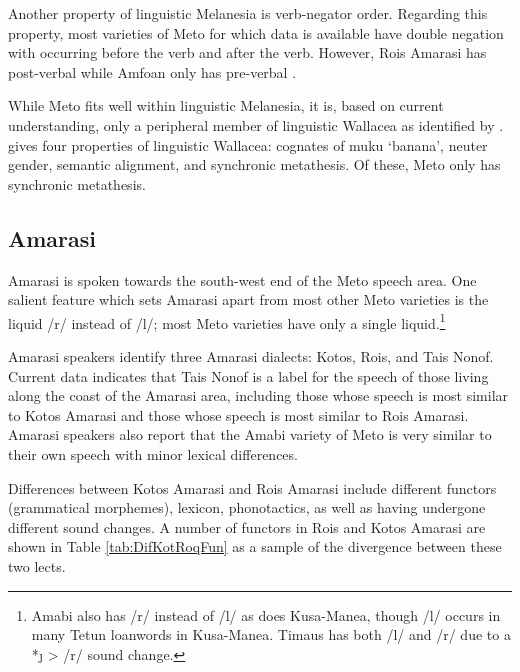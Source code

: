 Another property of linguistic Melanesia is verb-negator order.
Regarding this property, most varieties of Meto
for which data is available have double negation
with  occurring before the verb and  after the verb.
However, Ro{\Q}is Amarasi has post-verbal 
while Amfo{\Q}an only has pre-verbal .

While Meto fits well within linguistic Melanesia,
it is, based on current understanding,
only a peripheral member of linguistic Wallacea as identified by \cite{sc15}.
\citeauthor{sc15} gives four properties of linguistic
Wallacea: cognates of \su{\#}muku `banana', neuter gender,
semantic alignment, and synchronic metathesis.
Of these, Meto only has synchronic metathesis.

\subsection{Amarasi}\label{sec:Amarasi}
Amarasi is spoken towards the south-west end of the Meto speech area.
One salient feature which sets Amarasi apart from most other Meto
varieties is the liquid /r/ instead of /l/;
most Meto varieties have only a single liquid.\footnote{
		Amabi also has /r/ instead of /l/ as does
		Kusa-Manea, though /l/ occurs in many Tetun loanwords in Kusa-Manea.
		Timaus has both /l/ and /r/ due to a *{\j} > /r/ sound change.}

Amarasi speakers identify three Amarasi dialects: Kotos, Ro{\Q}is, and Tais Nonof.
Current data indicates that Tais Nonof is a label for the speech of
those living along the coast of the Amarasi area,
including those whose speech is most similar to Kotos Amarasi
and those whose speech is most similar to Ro{\Q}is Amarasi.
Amarasi speakers also report that the Amabi variety of Meto
is very similar to their own speech with minor lexical differences.

Differences between Kotos Amarasi and Ro{\Q}is Amarasi
include different functors (grammatical morphemes),
lexicon, phonotactics, as well as having undergone different sound changes.
A number of functors in Ro{\Q}is and Kotos Amarasi
are shown in Table \ref{tab:DifKotRoqFun}
as a sample of the divergence between these two lects.

